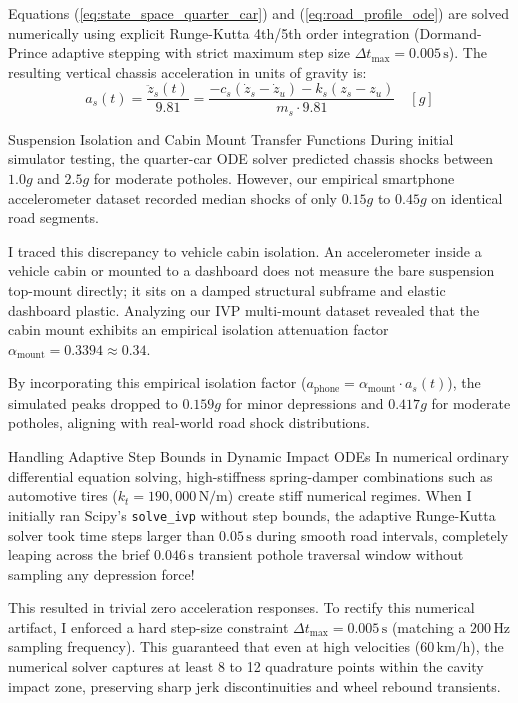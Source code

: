 Equations (\ref{eq:state_space_quarter_car}) and (\ref{eq:road_profile_ode}) are solved numerically using explicit Runge-Kutta 4th/5th order integration (Dormand-Prince adaptive stepping with strict maximum step size $\Delta t_{\max} = 0.005\,\text{s}$). The resulting vertical chassis acceleration in units of gravity is:
\begin{equation}
    a_s(t) = \frac{\ddot{z}_s(t)}{9.81} = \frac{-c_s(\dot{z}_s - \dot{z}_u) - k_s(z_s - z_u)}{m_s \cdot 9.81} \quad [g]
\end{equation}

\begin{designreflection}{Suspension Isolation and Cabin Mount Transfer Functions}
During initial simulator testing, the quarter-car ODE solver predicted chassis shocks between $1.0g$ and $2.5g$ for moderate potholes. However, our empirical smartphone accelerometer dataset recorded median shocks of only $0.15g$ to $0.45g$ on identical road segments. 

I traced this discrepancy to vehicle cabin isolation. An accelerometer inside a vehicle cabin or mounted to a dashboard does not measure the bare suspension top-mount directly; it sits on a damped structural subframe and elastic dashboard plastic. Analyzing our IVP multi-mount dataset revealed that the cabin mount exhibits an empirical isolation attenuation factor $\alpha_{\text{mount}} = 0.3394 \approx 0.34$. 

By incorporating this empirical isolation factor ($a_{\text{phone}} = \alpha_{\text{mount}} \cdot a_s(t)$), the simulated peaks dropped to $0.159g$ for minor depressions and $0.417g$ for moderate potholes, aligning with real-world road shock distributions.
\end{designreflection}

\begin{designreflection}{Handling Adaptive Step Bounds in Dynamic Impact ODEs}
In numerical ordinary differential equation solving, high-stiffness spring-damper combinations such as automotive tires ($k_t = 190,000\,\text{N/m}$) create stiff numerical regimes. When I initially ran Scipy's \texttt{solve\_ivp} without step bounds, the adaptive Runge-Kutta solver took time steps larger than $0.05\,\text{s}$ during smooth road intervals, completely leaping across the brief $0.046\,\text{s}$ transient pothole traversal window without sampling any depression force! 

This resulted in trivial zero acceleration responses. To rectify this numerical artifact, I enforced a hard step-size constraint $\Delta t_{\max} = 0.005\,\text{s}$ (matching a $200\,\text{Hz}$ sampling frequency). This guaranteed that even at high velocities ($60\,\text{km/h}$), the numerical solver captures at least 8 to 12 quadrature points within the cavity impact zone, preserving sharp jerk discontinuities and wheel rebound transients.
\end{designreflection}

